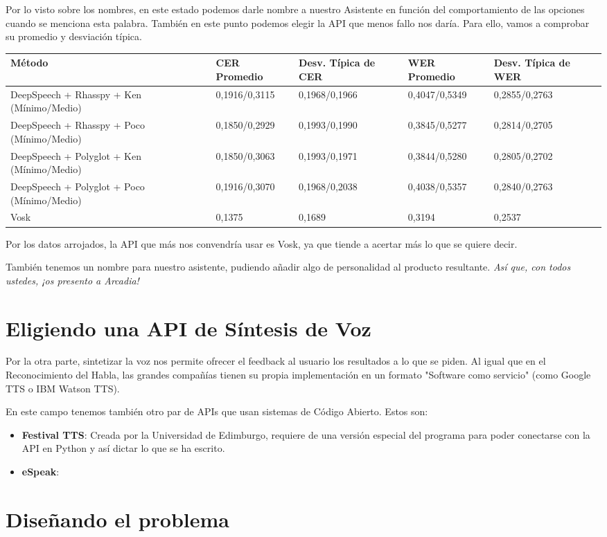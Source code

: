 Por lo visto sobre los nombres, en este estado podemos darle nombre a nuestro Asistente en función del comportamiento de las opciones cuando se menciona esta palabra. También en este punto podemos elegir la API que menos fallo nos daría. Para ello, vamos a comprobar su promedio y desviación típica.

\begin{xltabular}{\textwidth}{|X|X|X|X|X|}
	\hline
	Método & CER Promedio & Desv. Típica de CER & WER Promedio & Desv. Típica de WER \\ \hline
	DeepSpeech + Rhasspy + Ken (Mínimo/Medio) & 0,1916/0,3115 & 0,1968/0,1966 & 0,4047/0,5349 & 0,2855/0,2763 \\ \hline
	DeepSpeech + Rhasspy + Poco (Mínimo/Medio) & 0,1850/0,2929 & 0,1993/0,1990 & 0,3845/0,5277 & 0,2814/0,2705 \\ \hline
	DeepSpeech + Polyglot + Ken (Mínimo/Medio) & 0,1850/0,3063 & 0,1993/0,1971 & 0,3844/0,5280 & 0,2805/0,2702 \\ \hline
	DeepSpeech + Polyglot + Poco (Mínimo/Medio) & 0,1916/0,3070 & 0,1968/0,2038 & 0,4038/0,5357 & 0,2840/0,2763 \\ \hline
	Vosk & 0,1375 & 0,1689 & 0,3194 & 0,2537 \\ \hline
\end{xltabular} 

Por los datos arrojados, la API que más nos convendría usar es Vosk, ya que tiende a acertar más lo que se quiere decir. 

También tenemos un nombre para nuestro asistente, pudiendo añadir algo de personalidad al producto resultante. \textit{Así que, con todos ustedes, ¡os presento a Arcadia!}

\section{Eligiendo una API de Síntesis de Voz}
Por la otra parte, sintetizar la voz nos permite ofrecer el feedback al usuario los resultados a lo que se piden. Al igual que en el Reconocimiento del Habla, las grandes compañías tienen su propia implementación en un formato "Software como servicio" (como Google TTS o IBM Watson TTS).

En este campo tenemos también otro par de APIs que usan sistemas de Código Abierto. Estos son:

\begin{itemize}
	\item \textbf{Festival TTS}: Creada por la Universidad de Edimburgo, requiere de una versión especial del programa para poder conectarse con la API en Python y así dictar lo que se ha escrito.
	\item \textbf{eSpeak}:  
\end{itemize}

\section{Diseñando el problema}
 
